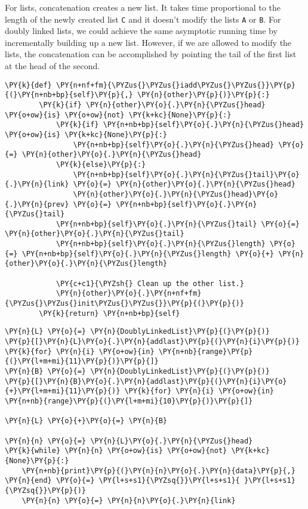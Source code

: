 For lists, concatenation creates a new list.
It takes time proportional to the length of the newly created list \texttt{C} and it doesn't modify the lists \texttt{A} or \texttt{B}.
For doubly linked lists, we could achieve the same asymptotic running time by incrementally building up a new list.
However, if we are allowed to modify the lists, the concatenation can be accomplished by pointing the tail of the first list at the head of the second.

\begin{Verbatim}[commandchars=\\\{\}]
    \PY{k}{def} \PY{n+nf+fm}{\PYZus{}\PYZus{}iadd\PYZus{}\PYZus{}}\PY{p}{(}\PY{n+nb+bp}{self}\PY{p}{,} \PY{n}{other}\PY{p}{)}\PY{p}{:}
        \PY{k}{if} \PY{n}{other}\PY{o}{.}\PY{n}{\PYZus{}head} \PY{o+ow}{is} \PY{o+ow}{not} \PY{k+kc}{None}\PY{p}{:}
            \PY{k}{if} \PY{n+nb+bp}{self}\PY{o}{.}\PY{n}{\PYZus{}head} \PY{o+ow}{is} \PY{k+kc}{None}\PY{p}{:}
                \PY{n+nb+bp}{self}\PY{o}{.}\PY{n}{\PYZus{}head} \PY{o}{=} \PY{n}{other}\PY{o}{.}\PY{n}{\PYZus{}head}
            \PY{k}{else}\PY{p}{:}
                \PY{n+nb+bp}{self}\PY{o}{.}\PY{n}{\PYZus{}tail}\PY{o}{.}\PY{n}{link} \PY{o}{=} \PY{n}{other}\PY{o}{.}\PY{n}{\PYZus{}head}
                \PY{n}{other}\PY{o}{.}\PY{n}{\PYZus{}head}\PY{o}{.}\PY{n}{prev} \PY{o}{=} \PY{n+nb+bp}{self}\PY{o}{.}\PY{n}{\PYZus{}tail}
            \PY{n+nb+bp}{self}\PY{o}{.}\PY{n}{\PYZus{}tail} \PY{o}{=} \PY{n}{other}\PY{o}{.}\PY{n}{\PYZus{}tail}
            \PY{n+nb+bp}{self}\PY{o}{.}\PY{n}{\PYZus{}length} \PY{o}{=} \PY{n+nb+bp}{self}\PY{o}{.}\PY{n}{\PYZus{}length} \PY{o}{+} \PY{n}{other}\PY{o}{.}\PY{n}{\PYZus{}length}

            \PY{c+c1}{\PYZsh{} Clean up the other list.}
            \PY{n}{other}\PY{o}{.}\PY{n+nf+fm}{\PYZus{}\PYZus{}init\PYZus{}\PYZus{}}\PY{p}{(}\PY{p}{)}
        \PY{k}{return} \PY{n+nb+bp}{self}
\end{Verbatim}


\begin{Verbatim}[commandchars=\\\{\}]
\PY{n}{L} \PY{o}{=} \PY{n}{DoublyLinkedList}\PY{p}{(}\PY{p}{)}
\PY{p}{[}\PY{n}{L}\PY{o}{.}\PY{n}{addlast}\PY{p}{(}\PY{n}{i}\PY{p}{)} \PY{k}{for} \PY{n}{i} \PY{o+ow}{in} \PY{n+nb}{range}\PY{p}{(}\PY{l+m+mi}{11}\PY{p}{)}\PY{p}{]}
\PY{n}{B} \PY{o}{=} \PY{n}{DoublyLinkedList}\PY{p}{(}\PY{p}{)}
\PY{p}{[}\PY{n}{B}\PY{o}{.}\PY{n}{addlast}\PY{p}{(}\PY{n}{i}\PY{o}{+}\PY{l+m+mi}{11}\PY{p}{)} \PY{k}{for} \PY{n}{i} \PY{o+ow}{in} \PY{n+nb}{range}\PY{p}{(}\PY{l+m+mi}{10}\PY{p}{)}\PY{p}{]}

\PY{n}{L} \PY{o}{+}\PY{o}{=} \PY{n}{B}

\PY{n}{n} \PY{o}{=} \PY{n}{L}\PY{o}{.}\PY{n}{\PYZus{}head}
\PY{k}{while} \PY{n}{n} \PY{o+ow}{is} \PY{o+ow}{not} \PY{k+kc}{None}\PY{p}{:}
    \PY{n+nb}{print}\PY{p}{(}\PY{n}{n}\PY{o}{.}\PY{n}{data}\PY{p}{,} \PY{n}{end} \PY{o}{=} \PY{l+s+s1}{\PYZsq{}}\PY{l+s+s1}{ }\PY{l+s+s1}{\PYZsq{}}\PY{p}{)}
    \PY{n}{n} \PY{o}{=} \PY{n}{n}\PY{o}{.}\PY{n}{link}
\end{Verbatim}



